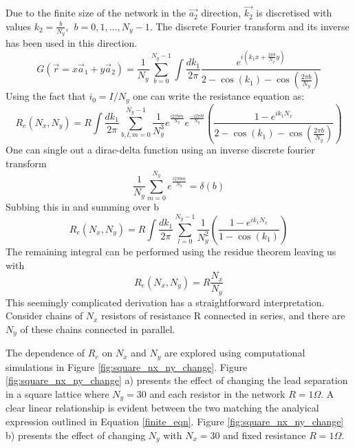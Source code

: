 Due to the finite size of the network in the $\vec{a_2}$ direction, $\vec{k_2}$ is discretised with values $k_2 = \frac{b}{N_y}, ~~b = 0,1,...,N_y-1$. The discrete Fourier transform and its inverse has been used in this direction. 
\begin{equation}
G(\vec{r} = x \vec{a}_1 + y \vec{a}_2) = \frac{1}{N_y}\sum_{b=0}^{N_y-1} \int \frac{dk_1}{2 \pi} \frac{e^{i(k_1  x +  \frac{2 \pi b}{N_y} y)}}{2 - \cos(k_1) - \cos(\frac{2 \pi b}{N_y})}
\end{equation}
Using the fact that $i_0 = I/N_y$ one can write the resistance equation as:
\begin{equation}
R_e(N_x,N_y) = R \int \frac{dk_1}{2 \pi} \sum_{b,l,m=0}^{N_y-1} \frac{1}{N_y^3}e^{\frac{i 2\pi b m}{N_y}}e^{\frac{-i 2\pi b l}{N_y}} \left(\frac{1 - e^{i k_1 N_x}}{2 - \cos(k_1) - \cos(\frac{2 \pi b}{N_y})} \right)
\end{equation}
One can single out a dirac-delta function using an inverse discrete  fourier transform
\begin{equation}
\frac{1}{N_y} \sum_{m=0}^{N_y} e^{\frac{i 2 \pi b m}{N_y}} = \delta(b)
\end{equation}
Subbing this in and summing over b
\begin{equation}
R_e(N_x,N_y) = R \int \frac{dk_1}{2 \pi} \sum_{l=0}^{N_y-1} \frac{1}{N_y^2} \left(\frac{1 - e^{i k_1 N_x}}{1 - \cos(k_1) } \right)
\end{equation}
The remaining integral can be performed using the residue theorem leaving us with
\begin{equation}
R_e(N_x,N_y) = R \frac{N_x}{N_y}
\label{finite_eqn}
\end{equation}
This seemingly complicated derivation has a straightforward interpretation. Consider chains of $N_x$ resistors of resistance R connected in series, and there are $N_y$ of these chains connected in parallel. 

The dependence of $R_e$ on $N_x$ and $N_y$ are explored using computational simulations in Figure \ref{fig:square_nx_ny_change}. Figure \ref{fig:square_nx_ny_change} a) presents the effect of changing the lead separation in a square lattice where $N_y = 30$ and each resistor in the network $R = 1 \Omega$. A clear linear relationship is evident between the two matching the analyical expression outlined in Equation \ref{finite_eqn}.  Figure \ref{fig:square_nx_ny_change} b) presents the effect of changing $N_y$ with $N_x = 30$ and fixed resistance $R = 1 \Omega$.
